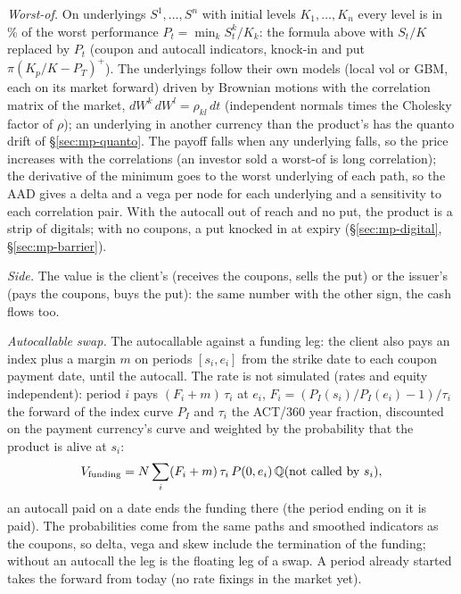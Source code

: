 \emph{Worst-of.} On underlyings $S^1, \dots, S^n$ with initial levels $K_1, \dots, K_n$ every level is in \% of the worst
performance $P_t = \min_k S^k_t / K_k$: the formula above with $S_t / K$ replaced by $P_t$ (coupon and autocall
indicators, knock-in and put $\pi (K_p/K - P_T)^+$). The underlyings follow their own models (local vol or GBM, each on
its market forward) driven by Brownian motions with the correlation matrix of the market, $dW^k\,dW^l = \rho_{kl}\,dt$
(independent normals times the Cholesky factor of $\rho$); an underlying in another currency than the product's has
the quanto drift of \S\ref{sec:mp-quanto}. The payoff falls when any underlying falls, so the price increases with the
correlations (an investor sold a worst-of is long correlation); the derivative of the minimum goes to the worst
underlying of each path, so the AAD gives a delta and a vega per node for each underlying and a sensitivity to each
correlation pair. With the autocall out
of reach and no put, the product is a strip of digitals; with no coupons, a put knocked in at expiry
(\S\ref{sec:mp-digital}, \S\ref{sec:mp-barrier}).

\emph{Side.} The value is the client's (receives the coupons, sells the put) or the issuer's (pays the coupons, buys
the put): the same number with the other sign, the cash flows too.

\emph{Autocallable swap.} The autocallable against a funding leg: the client also pays an index plus a margin $m$ on
periods $[s_i, e_i]$ from the strike date to each coupon payment date, until the autocall. The rate is not simulated
(rates and equity independent): period $i$ pays $(F_i + m)\,\tau_i$ at $e_i$, $F_i = (P_I(s_i)/P_I(e_i) - 1)/\tau_i$
the forward of the index curve $P_I$ and $\tau_i$ the ACT/360 year fraction, discounted on the payment currency's
curve and weighted by the probability that the product is alive at $s_i$:
\[ V_{\text{funding}} = N \sum_i (F_i + m)\,\tau_i\,P(0, e_i)\,\mathbb{Q}(\text{not called by } s_i), \]
an autocall paid on a date ends the funding there (the period ending on it is paid). The probabilities come from the
same paths and smoothed indicators as the coupons, so delta, vega and skew include the termination of the funding;
without an autocall the leg is the floating leg of a swap. A period already started takes the forward from today
(no rate fixings in the market yet).
